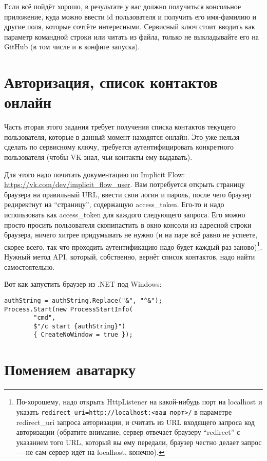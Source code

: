\documentclass{../../text-style}
\begin{document}
Если всё пойдёт хорошо, в результате у вас должно получиться консольное приложение, куда можно ввести id пользователя и получить его имя-фамилию и другие поля, которые сочтёте интересными. Сервисный ключ стоит вводить как параметр командной строки или читать из файла, только не выкладывайте его на GitHub (в том числе и в конфиге запуска).

\section{Авторизация, список контактов онлайн}

Часть вторая этого задания требует получения списка контактов текущего пользователя, которые в данный момент находятся онлайн. Это уже нельзя сделать по сервисному ключу, требуется аутентифицировать конкретного пользователя (чтобы VK знал, чьи контакты ему выдавать). 

Для этого надо почитать документацию по Implicit Flow: \url{https://vk.com/dev/implicit_flow_user}. Вам потребуется открыть страницу браузера на правильный URL, ввести свои логин и пароль, после чего браузер редиректнут на \enquote{страницу}, содержащую access\_token. Его-то и надо использовать как access\_token для каждого следующего запроса. Его можно просто просить пользователя скопипастить в окно консоли из адресной строки браузера, ничего хитрее придумывать не нужно (и на паре всё равно не успеете, скорее всего, так что проходить аутентификацию надо будет каждый раз заново)\footnote{По-хорошему, надо открыть HttpListener на какой-нибудь порт на localhost и указать \texttt{redirect_uri=http://localhost:<ваш порт>/} в параметре redirect\_uri запроса авторизации, и считать из URL входящего запроса код авторизации (обратите внимание, сервер отвечает браузеру \enquote{redirect} с указанием того URL, который вы ему передали, браузер честно делает запрос --- не сам сервер идёт на localhost, конечно).}. Нужный метод API, который, собственно, вернёт список контактов, надо найти самостоятельно.

Вот как запустить браузер из .NET под Windows:

\begin{verbatim}
authString = authString.Replace("&", "^&");
Process.Start(new ProcessStartInfo(
        "cmd", 
        $"/c start {authString}") 
        { CreateNoWindow = true });
\end{verbatim}

\section{Поменяем аватарку}
\end{document}
